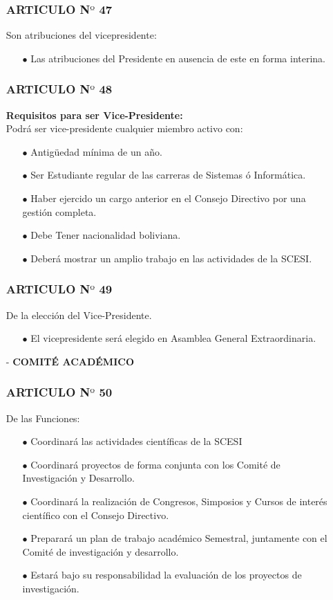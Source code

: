 \documentclass[letterpaper,11pt]{book}
\begin{document}
\begin{itemize}
\subsubsection*{ARTICULO N$º$ 47}
Son atribuciones del vicepresidente:
\begin{itemize}
\item[$\bullet$] Las atribuciones del Presidente en ausencia de este en forma interina.
\end{itemize}

\subsubsection*{ARTICULO N$º$ 48}
{\bf Requisitos para ser Vice-Presidente:}\\
Podrá ser vice-presidente cualquier miembro activo con: 
\begin{itemize}
\item[$\bullet$] Antigüedad mínima de un año. 
\item[$\bullet$] Ser Estudiante regular de las carreras de Sistemas ó Informática. 
\item[$\bullet$] Haber ejercido un cargo anterior en el Consejo Directivo por una gestión completa. 
\item[$\bullet$] Debe Tener nacionalidad boliviana.  
\item[$\bullet$] Deberá mostrar un amplio trabajo en las actividades de la SCESI.
\end{itemize}
         
\subsubsection*{ARTICULO N$º$ 49}
De la elección del Vice-Presidente.
\begin{itemize}
\item[$\bullet$] El vicepresidente será elegido en Asamblea General Extraordinaria.
\end{itemize}
\item[-] {\bf COMITÉ ACADÉMICO}
\subsubsection*{ARTICULO N$º$ 50}
De las Funciones:
\begin{itemize}
\item[$\bullet$] Coordinará las actividades científicas de la SCESI 
\item[$\bullet$] Coordinará proyectos de forma conjunta con los Comité de Investigación y Desarrollo. 
\item[$\bullet$] Coordinará la realización de Congresos, Simposios y Cursos de interés científico con el Consejo Directivo. 
\item[$\bullet$] Preparará un plan de trabajo académico Semestral, juntamente con el Comité de investigación y desarrollo. 
\item[$\bullet$] Estará bajo su responsabilidad la evaluación de los proyectos de investigación. 
\end{itemize}

\end{itemize}
\end{document}
